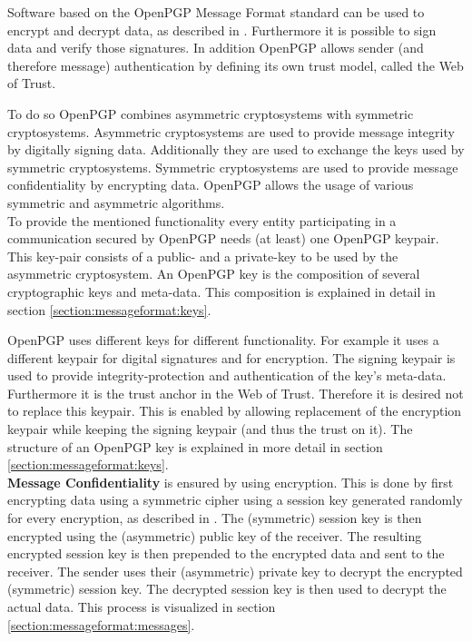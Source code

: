 Software based on the OpenPGP Message Format standard can be used to encrypt and decrypt data, as described in \cite[section 2]{RFC4880}. Furthermore it is possible to sign data and verify those signatures. In addition OpenPGP allows sender (and therefore message) authentication by defining its own trust model, called the Web of Trust. 

To do so OpenPGP combines asymmetric cryptosystems with symmetric cryptosystems. Asymmetric cryptosystems are used to provide message integrity by digitally signing data. Additionally they are used to exchange the keys used by symmetric cryptosystems. Symmetric cryptosystems are used to provide message confidentiality by encrypting data. OpenPGP allows the usage of various symmetric and asymmetric algorithms. \\


To provide the mentioned functionality every entity participating in a communication secured by OpenPGP needs (at least) one OpenPGP keypair. This key-pair consists of a public- and a private-key to be used by the asymmetric cryptosystem. An OpenPGP key is the composition of several cryptographic keys and meta-data. This composition is explained in detail in section \ref{section:messageformat:keys}. 


OpenPGP uses different keys for different functionality. For example it uses a different keypair for digital signatures and for encryption. The signing keypair is used to provide integrity-protection and authentication of the key's meta-data. Furthermore it is the trust anchor in the Web of Trust. Therefore it is desired not to replace this keypair. This is enabled by allowing replacement of the encryption keypair while keeping the signing keypair (and thus the trust on it). The structure of an OpenPGP key is explained in more detail in section \ref{section:messageformat:keys}. \\


\textbf{Message Confidentiality} is ensured by using encryption. This is done by first encrypting data using a symmetric cipher using a session key generated randomly for every encryption, as described in \cite[section 2.1]{RFC4880}. The (symmetric) session key is then encrypted using the (asymmetric) public key of the receiver. The resulting encrypted session key is then prepended to the encrypted data and sent to the receiver. The sender uses their (asymmetric) private key to decrypt the encrypted (symmetric) session key. The decrypted session key is then used to decrypt the actual data. This process is visualized in section \ref{section:messageformat:messages}. %

